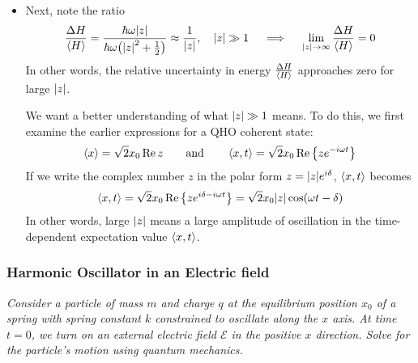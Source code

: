 \documentclass[11pt, a4paper]{article}
\newcommand{\eqtext}[1]{\qquad \text{#1} \qquad}
\begin{document}
\begin{itemize}
	\item Next, note the ratio
	\begin{equation*}
		\frac{\Delta H}{\ev{H}} = \frac{\hbar \omega \abs{z}}{\hbar \omega \big(\abs{z}^{2} + \tfrac{1}{2}\big)} \approx \frac{1}{\abs{z}}, \quad \abs{z} \gg 1 \quad \implies \quad \lim_{\abs{z} \to \infty} \frac{\Delta H}{\ev{H}} = 0
	\end{equation*}
	In other words, the relative uncertainty in energy $ \frac{\Delta H}{\ev{H}} $ approaches zero for large $ \abs{z} $. 
	
	We want a better understanding of what  $ \abs{z} \gg 1 $ means. To do this, we first examine the earlier expressions for a QHO coherent state:
	\begin{equation*}
		\ev{x} = \sqrt{2}x_{0}\Re z \eqtext{and} \ev{x, t} = \sqrt{2}x_{0}\Re \left\{ze^{-i\omega t}\right\}
	\end{equation*}
	If we write the complex number $ z $ in the polar form $ z = \abs{z}e^{i\delta} $, $ \ev{x, t}  $ becomes
	\begin{equation*}
		\ev{x, t}  =  \sqrt{2}x_{0}\Re \left\{ze^{i\delta -i\omega t}\right\} = \sqrt{2}x_{0}\abs{z}\cos(\omega t - \delta  )
	\end{equation*}
	In other words, large $ \abs{z} $ means a large amplitude of oscillation in the time-dependent expectation value $ \ev{x, t} $. 
	
\end{itemize}

\subsubsection{Harmonic Oscillator in an Electric field}
\textit{Consider a particle of mass $ m $ and charge $ q $ at the equilibrium position $ x_{0} $ of a spring with spring constant $ k $ constrained to oscillate along the $ x $ axis. At time $ t = 0 $, we turn on an external electric field $ \mathcal{E} $ in the positive $ x $ direction. Solve for the particle's motion using quantum mechanics. }
\end{document}
